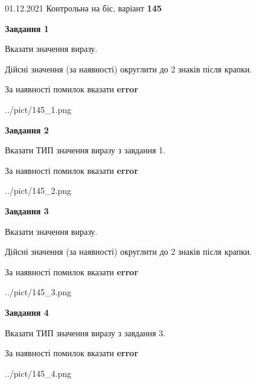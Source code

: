 \documentclass[11pt, ukrainian]{article}
\begin{document}
{01.12.2021 Контрольна на біс, варіант  \No \textbf { 145 }\par}
{
\begin {large}
{\begin {center}\textbf{Завдання 1}\end {center}}\par
Вказати значення виразу. \par
Дійсні значення (за наявності) округлити до 2 знаків після крапки. \par
За наявності помилок вказати \textbf{error}

\begin{center}
	{../pict/145_1.png}
\end{center}
\newpage

{\begin {center}\textbf{Завдання 2}\end {center}}\par
Вказати ТИП значення виразу з завдання 1. \par
За наявності помилок вказати \textbf{error}

\begin{center}
	{../pict/145_2.png}
\end{center}
\newpage

{\begin {center}\textbf{Завдання 3}\end {center}}\par
Вказати значення виразу. \par
Дійсні значення (за наявності) округлити до 2 знаків після крапки. \par
За наявності помилок вказати \textbf{error}

\begin{center}
	{../pict/145_3.png}
\end{center}
\newpage

{\begin {center}\textbf{Завдання 4}\end {center}}\par
Вказати ТИП значення виразу з завдання 3. \par
За наявності помилок вказати \textbf{error}

\begin{center}
	{../pict/145_4.png}
\end{center}
\newpage


\end{large}}
\end{document}
